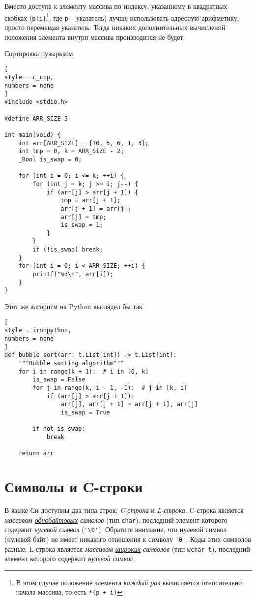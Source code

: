 \documentclass[%
	11pt,
	a4paper,
	utf8,
		]{article}
\begin{document}
Вместо доступа к элементу массива по индексу, указанному в квадратных скобках (\texttt{p[i]}\footnote{В этом случае положение элемента \emph{каждый раз} вычисляется относительно начала массива, то есть \texttt{*(p + i)}}, где \verb|p| -- указатель) лучше использовать адресную арифметику, просто перемещая указатель. Тогда никаких дополнительных вычислений положения элемента внутри массива производится не будет.

Сортировка пузырьком
\begin{lstlisting}[
style = c_cpp,
numbers = none
]
#include <stdio.h>

#define ARR_SIZE 5

int main(void) {
    int arr[ARR_SIZE] = {10, 5, 6, 1, 3};
    int tmp = 0, k = ARR_SIZE - 2;
    _Bool is_swap = 0;
    
    for (int i = 0; i <= k; ++i) {
        for (int j = k; j >= i; j--) {
            if (arr[j] > arr[j + 1]) {
                tmp = arr[j + 1];
                arr[j + 1] = arr[j];
                arr[j] = tmp;
                is_swap = 1;
            }
        }
        if (!is_swap) break;
    }
    for (int i = 0; i < ARR_SIZE; ++i) {
        printf("%d\n", arr[i]);
    }
}
\end{lstlisting}

Этот же алгоритм на Python выглядел бы так
\begin{lstlisting}[
style = ironpython,
numbers = none
]
def bubble_sort(arr: t.List[int]) -> t.List[int]:
    """Bubble sorting algorithm"""
    for i in range(k + 1):  # i in [0, k]
        is_swap = False
        for j in range(k, i - 1, -1):  # j in [k, i]
            if (arr[j] > arr[j + 1]):
                arr[j], arr[j + 1] = arr[j + 1], arr[j]
                is_swap = True
        
        if not is_swap:
            break
            
    return arr
\end{lstlisting}

\section{Символы и C-строки}

В языке Си доступны два типа строк: \emph{C-строка} и \emph{L-строка}. C-строка является \emph{массивом \underline{однобайтовых} симолов} (тип \verb*|char|), последний элемент которого содержит \emph{нулевой символ} (\verb|'\0'|). Обратите внимание, что нулевой символ (нулевой байт) не имеет никакого отношения к символу \verb*|'0'|. Коды этих символов разные. L-строка является \emph{массивом \underline{широких} символов} (тип \verb*|wchar_t|), последний элемент которого содержит \emph{нулевой символ}.
\end{document}
